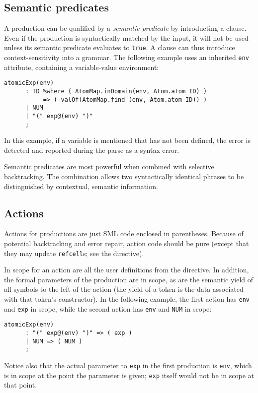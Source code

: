 \subsection{Semantic predicates}

A production can be qualified by a \emph{semantic predicate} by introducting a  clause.  Even if the production is syntactically matched by the input, it will not be used unless its semantic predicate evaluates to \texttt{true}.  A  clause can thus introduce context-sensitivity into a grammar.  The following example uses an inherited \texttt{env} attribute, containing a variable-value environment:
\begin{lstlisting}[language=MLAntlr]
    atomicExp(env)
      : ID %where ( AtomMap.inDomain(env, Atom.atom ID) )
           => ( valOf(AtomMap.find (env, Atom.atom ID)) )
      | NUM
      | "(" exp@(env) ")"
      ;
\end{lstlisting}%
In this example, if a variable is mentioned that has not been defined, the error is detected and reported during the parse as a syntax error.

Semantic predicates are most powerful when combined with selective backtracking.  The combination allows two syntactically identical phrases to be distinguished by contextual, semantic information.

\subsection{Actions}\label{sec:antlr-actions}

Actions for productions are just SML code enclosed in parentheses.  Because of potential backtracking and error repair, action code should be pure (except that they may update \antlr{} \texttt{refcell}s; see the  directive).

In scope for an action are all the user definitions from the  directive.  In addition, the formal parameters of the production are in scope, as are the semantic yield of all symbols to the left of the action (the yield of a token is the data associated with that token's constructor).  In the following example, the first action has \texttt{env} and \texttt{exp} in scope, while the second action has \texttt{env} and \texttt{NUM} in scope:
\begin{lstlisting}[language=MLAntlr]
    atomicExp(env)
      : "(" exp@(env) ")" => ( exp )
      | NUM => ( NUM )
      ;
\end{lstlisting}%
Notice also that the actual parameter to \texttt{exp} in the first production is \texttt{env}, which is in scope at the point the parameter is given; \texttt{exp} itself would not be in scope at that point.

